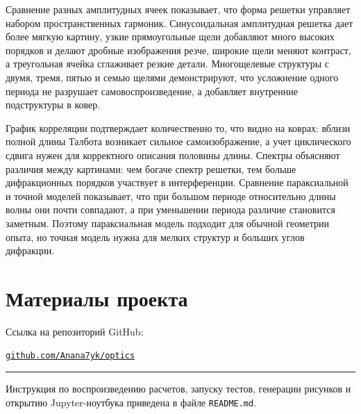 \documentclass[12pt,a4paper]{article}
\begin{document}
Сравнение разных амплитудных ячеек показывает, что форма решетки управляет набором пространственных гармоник. Синусоидальная амплитудная решетка дает более мягкую картину, узкие прямоугольные щели добавляют много высоких порядков и делают дробные изображения резче, широкие щели меняют контраст, а треугольная ячейка сглаживает резкие детали. Многощелевые структуры с двумя, тремя, пятью и семью щелями демонстрируют, что усложнение одного периода не разрушает самовоспроизведение, а добавляет внутренние подструктуры в ковер.

График корреляции подтверждает количественно то, что видно на коврах: вблизи полной длины Талбота возникает сильное самоизображение, а учет циклического сдвига нужен для корректного описания половины длины. Спектры объясняют различия между картинами: чем богаче спектр решетки, тем больше дифракционных порядков участвует в интерференции. Сравнение параксиальной и точной моделей показывает, что при большом периоде относительно длины волны они почти совпадают, а при уменьшении периода различие становится заметным. Поэтому параксиальная модель подходит для обычной геометрии опыта, но точная модель нужна для мелких структур и больших углов дифракции.

\section{Материалы проекта}

Ссылка на репозиторий GitHub:

\vspace{5mm}
\noindent\href{https://github.com/Anana7yk/optics#}{\texttt{github.com/Anana7yk/optics}}
\vspace{4mm}

\noindent\rule{0.92\textwidth}{0.4pt}
\vspace{4mm}

Инструкция по воспроизведению расчетов, запуску тестов, генерации рисунков и открытию Jupyter-ноутбука приведена в файле \texttt{README.md}.
\end{document}
